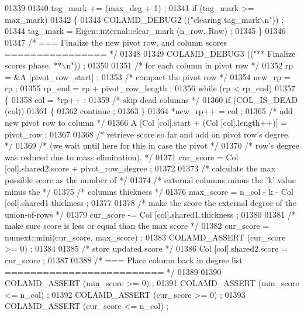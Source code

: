 \begin{DoxyCode}
{{{{{{{{{{{{{{{{{{{{{{{{{{{{01339 
01340     tag\_mark += (max\_deg + 1) ;
01341     \textcolor{keywordflow}{if} (tag\_mark >= max\_mark)
01342     \{
01343       COLAMD\_DEBUG2 ((\textcolor{stringliteral}{"clearing tag\_mark\(\backslash\)n"})) ;
01344       tag\_mark = Eigen::internal::clear\_mark (n\_row, Row) ;
01345     \}
01346 
01347     \textcolor{comment}{/* === Finalize the new pivot row, and column scores ================ */}
01348 
01349     COLAMD\_DEBUG3 ((\textcolor{stringliteral}{"** Finalize scores phase. **\(\backslash\)n"})) ;
01350 
01351     \textcolor{comment}{/* for each column in pivot row */}
01352     rp = &A [pivot\_row\_start] ;
01353     \textcolor{comment}{/* compact the pivot row */}
01354     new\_rp = rp ;
01355     rp\_end = rp + pivot\_row\_length ;
01356     \textcolor{keywordflow}{while} (rp < rp\_end)
01357     \{
01358       col = *rp++ ;
01359       \textcolor{comment}{/* skip dead columns */}
01360       \textcolor{keywordflow}{if} (COL\_IS\_DEAD (col))
01361       \{
01362     continue ;
01363       \}
01364       *new\_rp++ = col ;
01365       \textcolor{comment}{/* add new pivot row to column */}
01366       A [Col [col].start + (Col [col].length++)] = pivot\_row ;
01367 
01368       \textcolor{comment}{/* retrieve score so far and add on pivot row's degree. */}
01369       \textcolor{comment}{/* (we wait until here for this in case the pivot */}
01370       \textcolor{comment}{/* row's degree was reduced due to mass elimination). */}
01371       cur\_score = Col [col].shared2.score + pivot\_row\_degree ;
01372 
01373       \textcolor{comment}{/* calculate the max possible score as the number of */}
01374       \textcolor{comment}{/* external columns minus the 'k' value minus the */}
01375       \textcolor{comment}{/* columns thickness */}
01376       max\_score = n\_col - k - Col [col].shared1.thickness ;
01377 
01378       \textcolor{comment}{/* make the score the external degree of the union-of-rows */}
01379       cur\_score -= Col [col].shared1.thickness ;
01380 
01381       \textcolor{comment}{/* make sure score is less or equal than the max score */}
01382       cur\_score = numext::mini(cur\_score, max\_score) ;
01383       COLAMD\_ASSERT (cur\_score >= 0) ;
01384 
01385       \textcolor{comment}{/* store updated score */}
01386       Col [col].shared2.score = cur\_score ;
01387 
01388       \textcolor{comment}{/* === Place column back in degree list ========================= */}
01389 
01390       COLAMD\_ASSERT (min\_score >= 0) ;
01391       COLAMD\_ASSERT (min\_score <= n\_col) ;
01392       COLAMD\_ASSERT (cur\_score >= 0) ;
01393       COLAMD\_ASSERT (cur\_score <= n\_col) ;
}}}}}}}}}}}}}}}}}}}}}}}}}}}}
\end{DoxyCode}
